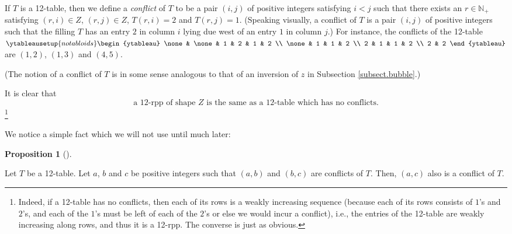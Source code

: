 \documentclass[numbers=enddot,12pt,final,onecolumn,notitlepage]{scrartcl}%
\theoremstyle{definition}
\newtheorem{prop}[theo]{Proposition}
\newenvironment{proposition}[1][]
{\begin{prop}[#1]\begin{leftbar}}
{\end{leftbar}\end{prop}}
\begin{document}
If $T$ is a 12-table, then we define a \textit{conflict} of $T$ to be a pair
$\left(  i,j\right)  $ of positive integers satisfying $i<j$ such that there
exists an $r\in\mathbb{N}_{+}$ satisfying $\left(  r,i\right)  \in Z$,
$\left(  r,j\right)  \in Z$, $T\left(  r,i\right)  =2$ and $T\left(
r,j\right)  =1$. (Speaking visually, a conflict of $T$ is a pair $\left(
i,j\right)  $ of positive integers such that the filling $T$ has an entry $2$
in column $i$ lying due west of an entry $1$ in column $j$.) For instance, the
conflicts of the 12-table $%
\ytableausetup{notabloids}
\begin{ytableau}
\none& \none& 1 & 2 & 1 & 2 \\
\none& 1 & 1 & 2 \\
2 & 1 & 1 & 2 \\
2 & 2
\end{ytableau}%
$ are $\left(  1,2\right)  $, $\left(  1,3\right)  $ and $\left(  4,5\right)
$.

(The notion of a conflict of $T$ is in some sense analogous to that of an
inversion of $z$ in Subsection \ref{subsect.bubble}.)

It is clear that%
\begin{equation}
\text{a 12-rpp of shape }Z\text{ is the same as a 12-table which has no
conflicts.} \label{pf.lem.BK.no-conflicts}%
\end{equation}
\footnote{Indeed, if a 12-table has no conflicts, then each of its rows is a
weakly increasing sequence (because each of its rows consists of $1$'s and
$2$'s, and each of the $1$'s must be left of each of the $2$'s or else we
would incur a conflict), i.e., the entries of the 12-table are weakly
increasing along rows, and thus it is a 12-rpp. The converse is just as
obvious.}

We notice a simple fact which we will not use until much later:

\begin{proposition}
\label{prop.conflict.transitive}Let $T$ be a 12-table. Let $a$, $b$ and $c$ be
positive integers such that $\left(  a,b\right)  $ and $\left(  b,c\right)  $
are conflicts of $T$. Then, $\left(  a,c\right)  $ also is a conflict of $T$.
\end{proposition}
\end{document}
